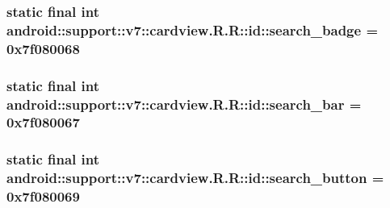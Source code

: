 \hypertarget{classandroid_1_1support_1_1v7_1_1cardview_1_1_r_1_1id_de83a0c850bd59ba2cf4715eb7a18dd7}{
\subsubsection[{search\_\-badge}]{\setlength{\rightskip}{0pt plus 5cm}static final int android::support::v7::cardview.R.R::id::search\_\-badge = 0x7f080068}}
\label{classandroid_1_1support_1_1v7_1_1cardview_1_1_r_1_1id_de83a0c850bd59ba2cf4715eb7a18dd7}


\hypertarget{classandroid_1_1support_1_1v7_1_1cardview_1_1_r_1_1id_9a73b503178e7e1f683391699d6e593b}{
\subsubsection[{search\_\-bar}]{\setlength{\rightskip}{0pt plus 5cm}static final int android::support::v7::cardview.R.R::id::search\_\-bar = 0x7f080067}}
\label{classandroid_1_1support_1_1v7_1_1cardview_1_1_r_1_1id_9a73b503178e7e1f683391699d6e593b}


\hypertarget{classandroid_1_1support_1_1v7_1_1cardview_1_1_r_1_1id_bdc84927ea9089580206b26f9f8860d0}{
\subsubsection[{search\_\-button}]{\setlength{\rightskip}{0pt plus 5cm}static final int android::support::v7::cardview.R.R::id::search\_\-button = 0x7f080069}}
\label{classandroid_1_1support_1_1v7_1_1cardview_1_1_r_1_1id_bdc84927ea9089580206b26f9f8860d0}


